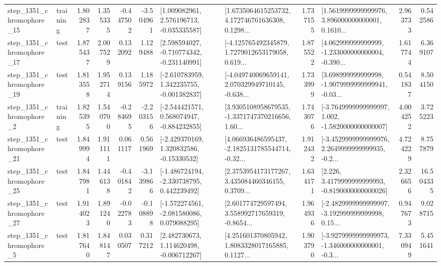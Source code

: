 \begin{tabular}{llrrrrllrlrr}
 step\_1351\_chromophore\_15 &  training &      1.802837 &    1.355335 &     -0.447502 & -3.504961 &    [1.009082961, 2.576196713, -0.035335587] &  [1.6735064615253732, 4.172746761636308, 0.1298... &       1.737155 &  [1.5619999999999976, 3.896000000000001, 0.1610... &            2.963733 &          0.542586 \\
 step\_1351\_chromophore\_17 &      test &      1.875437 &    2.007529 &      0.132092 &  1.129488 &   [2.598594027, -0.710774342, -0.231140991] &  [-4.125765492345879, 1.7279012653179058, 0.619... &       1.875522 &  [4.062999999999999, -1.233000000000004, -0.390... &            1.617744 &          6.369107 \\
 step\_1351\_chromophore\_19 &      test &      1.813558 &    1.952714 &      0.139156 &  1.185972 &   [-2.610783959, 1.342235755, -0.001382837] &  [-4.049740069659141, 2.070329949710145, -0.638... &       1.733999 &  [3.698999999999998, -1.9079999999999941, -0.03... &            0.541837 &          8.504150 \\
  step\_1351\_chromophore\_2 &  training &      1.825395 &    1.540700 &     -0.284695 & -2.203156 &   [-2.544421571, 0.568074947, -0.884232855] &  [3.9305108958679535, -1.3371747370216656, 1.60... &       1.743076 &  [-3.7649999999999997, 1.002, -1.5820000000000007] &            4.004252 &          3.725223 \\
 step\_1351\_chromophore\_21 &      test &      1.849994 &    1.911111 &      0.061117 &  0.561969 &    [-2.429370169, 1.320832586, -0.15330532] &  [4.066936486595437, -2.1825131785544714, -0.32... &       1.912432 &  [-3.4529999999999976, 2.2649999999999935, -0.2... &            4.724229 &          8.757879 \\
 step\_1351\_chromophore\_25 &      test &      1.847981 &    1.446138 &     -0.401842 & -3.139866 &   [-1.486724194, -2.330738795, 0.442239492] &  [2.3753954173177267, 3.435084460346155, 0.3709... &       1.634171 &   [2.226, 3.4179999999999993, -0.8190000000000026] &            2.326656 &         16.504335 \\
 step\_1351\_chromophore\_27 &      test &      1.914023 &    1.891240 &     -0.022783 & -0.108898 &   [-1.572274561, -2.081580086, 0.079088295] &  [2.601774729597494, 3.558992717659319, -0.8654... &       1.964936 &  [-2.4829999999999997, -3.192999999999998, 0.15... &            0.947673 &          9.028715 \\
  step\_1351\_chromophore\_5 &      test &      1.817640 &    1.848147 &      0.030507 &  0.317212 &    [2.482730673, 1.114620498, -0.006712267] &  [4.251601370805942, 1.8083328017165885, 0.1127... &       1.903790 &  [-3.9279999999999973, -1.346000000000001, -0.3... &            7.330949 &          5.451641 \\

\end{tabular}
